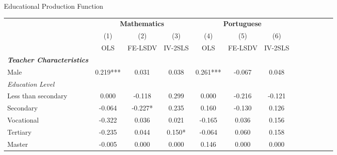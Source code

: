 \documentclass{beamer}
\begin{document}
\begin{frame}{Educational Production Function}
\vspace{-27pt} \flushright \hyperlink{Mirror}{\beamerbutton{\textcolor{red}{Mirror}}}
\vspace{15pt}
\begin{table}
\begin{adjustbox}{max width=\textwidth} 
\begin{tabular}{l*{6}{cc}}
\toprule
& \multicolumn{3}{c}{\textbf{Mathematics}} &                      \multicolumn{3}{c}{\textbf{Portuguese}} \\            \cline{2-4}              \cline{5-7}                    
                    &\multicolumn{1}{c}{(1)}   &\multicolumn{1}{c}{(2)}   &\multicolumn{1}{c}{(3)}   &\multicolumn{1}{c}{(4)}   &\multicolumn{1}{c}{(5)}   &\multicolumn{1}{c}{(6)}   \\
                    &         OLS   &     FE-LSDV   &     IV-2SLS   &         OLS   &     FE-LSDV   &     IV-2SLS   \vspace{-3pt}\\
\midrule 
\textbf{\emph{Teacher Characteristics}}&               &               &               &               &               &               \\
Male                &       0.219***&       0.031   &       0.038   &       0.261***&      -0.067   &       0.048    \\
\emph{Education Level}&               &               &               &               &               &               \vspace{-2pt} \\
Less than secondary &       0.000   &      -0.118   &       0.299   &       0.000   &      -0.216   &      -0.121   \vspace{-2pt} \\
Secondary           &      -0.064   &      -0.227*  &       0.235   &       0.160   &      -0.130   &       0.126   \vspace{-2pt} \\
Vocational          &      -0.322   &       0.036   &       0.021   &      -0.165   &       0.036   &       0.156   \vspace{-2pt} \\
Tertiary            &      -0.235   &       0.044   &       0.150*  &      -0.064   &       0.060   &       0.158   \vspace{-2pt} \\
Master              &      -0.005   &       0.000   &       0.000   &       0.146   &       0.000   &       0.000   \vspace{-2pt} \\

\end{tabular}
\end{adjustbox}
\end{table}
\end{frame}
\end{document}
